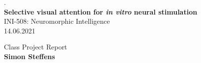 \documentclass[8pt]{beamer}
\begin{document}
\justify
\linespread{1}
\small

\thispagestyle{empty}
\begin{center}
    \vspace{1cm}
    	\tiny.\\
		\LARGE \textbf{Selective visual attention for \textit{in vitro} neural stimulation} \\
			
		\vspace{1.8cm}
		\large
		INI-508: Neuromorphic Intelligence \\
		\vspace{0.1cm}
		14.06.2021
			
		\vspace{0.7cm}
		Class Project Report \\
		\textbf{Simon Steffens}
    \pagebreak
\end{center}
\end{document}
